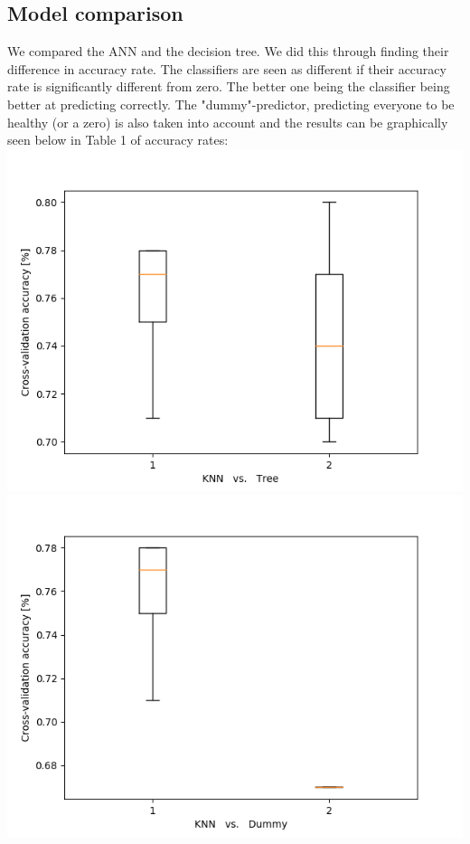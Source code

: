 \subsection{Model comparison}
We compared the ANN and the decision tree. We did this through finding their difference in accuracy rate.
The classifiers are seen as different if their accuracy rate is significantly different from zero. The better one being
the classifier being better at predicting correctly.
The "dummy"-predictor, predicting everyone to be healthy (or a zero) is also taken
into account and the results can be graphically seen below in Table 1 of accuracy rates:
\includegraphics[width=\textwidth]{comp_knn_trees.png}
\includegraphics[width=\textwidth]{comp_knn_dummy.png}

